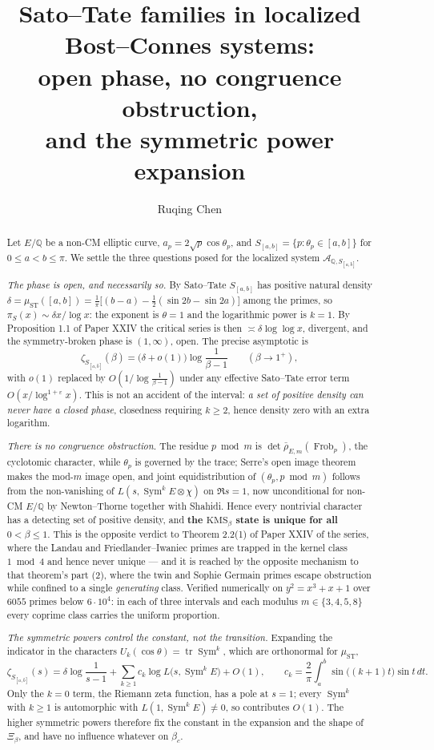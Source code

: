 \documentclass[11pt]{amsart}
\title[Sato--Tate families]{Sato--Tate families in localized Bost--Connes systems:\\ open phase, no congruence obstruction,\\ and the symmetric power expansion}
\author{Ruqing Chen}
\date{}
\numberwithin{equation}{section}
\theoremstyle{definition}
\theoremstyle{remark}
\newcommand{\Q}{\mathbb{Q}}
\newcommand{\cA}{\mathcal{A}}
\newcommand{\Sym}{\operatorname{Sym}}
\newcommand{\Tr}{\operatorname{tr}}
\newcommand{\Frob}{\operatorname{Frob}}
\newcommand{\ST}{\mathrm{ST}}
\begin{document}
\begin{abstract}
Let $E/\Q$ be a non-CM elliptic curve, $a_p=2\sqrt p\cos\theta_p$, and
$S_{[a,b]}=\{p:\theta_p\in[a,b]\}$ for $0\le a<b\le\pi$. We settle the three questions posed
for the localized system $\cA_{\Q,S_{[a,b]}}$.

\emph{The phase is open, and necessarily so.} By Sato--Tate $S_{[a,b]}$ has positive natural
density $\delta=\mu_\ST([a,b])=\frac1\pi\bigl[(b-a)-\tfrac12(\sin2b-\sin2a)\bigr]$ among the
primes, so $\pi_S(x)\sim\delta x/\log x$: the exponent is $\theta=1$ and the logarithmic power
is $k=1$. By Proposition 1.1 of Paper XXIV the critical series is then
$\asymp\delta\log\log x$, divergent, and the symmetry-broken phase is $(1,\infty)$, open. The
precise asymptotic is
\[
\zeta_{S_{[a,b]}}(\beta)=\bigl(\delta+o(1)\bigr)\log\frac{1}{\beta-1}\qquad(\beta\to1^+),
\]
with $o(1)$ replaced by $O(1/\log\frac{1}{\beta-1})$ under any effective Sato--Tate error
term $O(x/\log^{1+\varepsilon}x)$.
This is not an accident of the interval: \emph{a set of positive density can never have a
closed phase}, closedness requiring $k\ge2$, hence density zero with an extra logarithm.

\emph{There is no congruence obstruction.} The residue $p\bmod m$ is
$\det\bar\rho_{E,m}(\Frob_p)$, the cyclotomic character, while $\theta_p$ is governed by the
trace; Serre's open image theorem makes the mod-$m$ image open, and joint equidistribution of
$(\theta_p,p\bmod m)$ follows from the non-vanishing of $L(s,\Sym^kE\otimes\chi)$ on
$\Re s=1$, now unconditional for non-CM $E/\Q$ by Newton--Thorne together with Shahidi.
Hence every nontrivial character has a detecting set of positive density, and
\textbf{the $\mathrm{KMS}_\beta$ state is unique for all $0<\beta\le1$}. This is the
opposite verdict to Theorem 2.2(1) of Paper XXIV of the series, where the Landau and
Friedlander--Iwaniec primes are trapped in the kernel class $1\bmod4$ and hence
never unique --- and it is reached by the opposite mechanism to that theorem's part (2),
where the twin and Sophie Germain primes escape obstruction while confined to a single
\emph{generating} class. Verified numerically on $y^2=x^3+x+1$ over $6055$ primes below $6\cdot10^4$:
in each of three intervals and each modulus $m\in\{3,4,5,8\}$ every coprime class carries the
uniform proportion.

\emph{The symmetric powers control the constant, not the transition.} Expanding the indicator
in the characters $U_k(\cos\theta)=\Tr\Sym^k$, which are orthonormal for $\mu_\ST$,
\[
\zeta_{S_{[a,b]}}(s)=\delta\log\frac{1}{s-1}+\sum_{k\ge1}c_k\log L\bigl(s,\Sym^kE\bigr)+O(1),
\qquad
c_k=\frac2\pi\int_a^b\sin\bigl((k+1)t\bigr)\sin t\,dt .
\]
Only the $k=0$ term, the Riemann zeta function, has a pole at $s=1$; every $\Sym^k$ with
$k\ge1$ is automorphic with $L(1,\Sym^kE)\ne0$, so contributes $O(1)$. The higher symmetric
powers therefore fix the constant in the expansion and the shape of $\Xi_\beta$, and have no
influence whatever on $\beta_c$.


\end{abstract}
\end{document}
